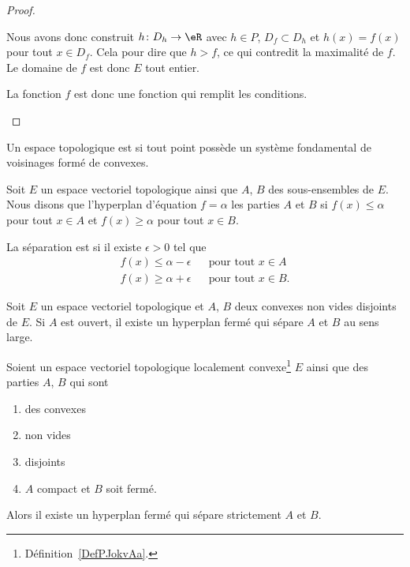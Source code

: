 \begin{proof}
\begin{subproof}
			Nous avons donc construit \( h\colon D_h\to \eR\) avec \( h\in P\), \( D_f\subset D_h\) et \( h(x)=f(x)\) pour tout \( x\in D_f\). Cela pour dire que \( h>f\), ce qui contredit la maximalité de \( f\). Le domaine de \( f\) est donc \( E\) tout entier.

			La fonction \( f\) est donc une fonction qui remplit les conditions.

		\end{subproof}
	\end{proof}

	\begin{definition}  \label{DefPJokvAa}
		Un espace topologique est  si tout point possède un système fondamental de voisinages formé de convexes.
	\end{definition}

	\begin{definition}
		Soit \( E\) un espace vectoriel topologique ainsi que \( A\), \( B\) des sous-ensembles de \( E\). Nous disons que l'hyperplan d'équation \( f=\alpha\)  les parties \( A\) et \( B\) si \( f(x)\leq \alpha\) pour tout \( x\in A\) et \( f(x)\geq \alpha\) pour tout \( x\in B\).

		La séparation est  si il existe \( \epsilon>0\) tel que
		\begin{subequations}
			\begin{align}
				f(x)\leq \alpha-\epsilon &  & \text{pour tout } x\in A  \\
				f(x)\geq \alpha+\epsilon &  & \text{pour tout } x\in B.
			\end{align}
		\end{subequations}
	\end{definition}

	\begin{theorem}  \label{ThoSAJjdZc}
		Soit \( E\) un espace vectoriel topologique et \( A\), \( B\) deux convexes non vides disjoints de \( E\). Si \( A\) est ouvert, il existe un hyperplan fermé qui sépare \( A\) et \( B\) au sens large.
	\end{theorem}

	\begin{theorem} \label{ThoACuKgtW}
		Soient un espace vectoriel topologique localement convexe\footnote{Définition~\ref{DefPJokvAa}.} \( E\) ainsi que des parties \( A\), \( B\) qui sont
		\begin{enumerate}
			\item
			      des convexes
			\item
			      non vides
			\item
			      disjoints
			\item
			      \( A\) compact et \( B\) soit fermé.
		\end{enumerate}
		Alors il existe un hyperplan fermé qui sépare strictement \( A\) et \( B\).
	\end{theorem}

